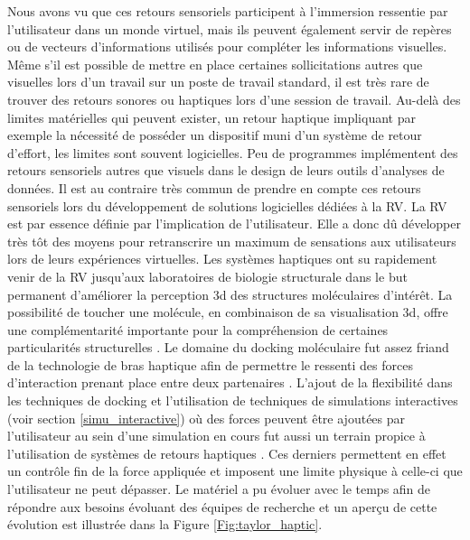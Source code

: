 
Nous avons vu que ces retours sensoriels participent à l'immersion ressentie par l'utilisateur dans un monde virtuel, mais ils peuvent également servir de repères ou de vecteurs d'informations utilisés pour compléter les informations visuelles. Même s'il est possible de mettre en place certaines sollicitations autres que visuelles lors d'un travail sur un poste de travail standard, il est très rare de trouver des retours sonores ou haptiques lors d'une session de travail. Au-delà des limites matérielles qui peuvent exister, un retour haptique impliquant par exemple la nécessité de posséder un dispositif muni d'un système de retour d'effort, les limites sont souvent logicielles. Peu de programmes implémentent des retours sensoriels autres que visuels dans le design de leurs outils d'analyses de données. Il est au contraire très commun de prendre en compte ces retours sensoriels lors du développement de solutions logicielles dédiées à la RV. La RV est par essence définie par l'implication de l'utilisateur. Elle a donc dû développer très tôt des moyens pour retranscrire un maximum de sensations aux utilisateurs lors de leurs expériences virtuelles. Les systèmes haptiques ont su rapidement venir de la RV jusqu'aux laboratoires de biologie structurale dans le but permanent d'améliorer la perception 3d des structures moléculaires d'intérêt. La possibilité de toucher une molécule, en combinaison de sa visualisation 3d, offre une complémentarité importante pour la compréhension de certaines particularités structurelles \cite{stocks2009interacting}. 
Le domaine du docking moléculaire fut assez friand de la technologie de bras haptique afin de permettre le ressenti des forces d'interaction prenant place entre deux partenaires \cite{nagata2002concept, sankaranarayanan2003role}. L'ajout de la flexibilité dans les techniques de docking et l'utilisation de techniques de simulations interactives (voir section \ref{simu_interactive}) où des forces peuvent être ajoutées par l'utilisateur au sein d'une simulation en cours fut aussi un terrain propice à l'utilisation de systèmes de retours haptiques \cite{stone2001system}. Ces derniers permettent en effet un contrôle fin de la force appliquée et imposent une limite physique à celle-ci que l'utilisateur ne peut dépasser. Le matériel a pu évoluer avec le temps afin de répondre aux besoins évoluant des équipes de recherche et un aperçu de cette évolution est illustrée dans la Figure \ref{Fig:taylor_haptic}.

